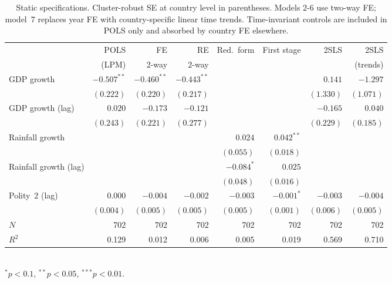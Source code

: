 \documentclass[11pt,a4paper]{article}
\begin{document}
\begin{table}[H]
\centering
\caption{Static specifications. Cluster-robust SE at country level in
parentheses. Models 2-6 use two-way FE; model~7 replaces year FE with
country-specific linear time trends. Time-invariant controls are
included in POLS only and absorbed by country FE elsewhere.}
\label{tab:main}
\small
\begin{tabular}{lrrrrrrr}
\toprule
 & POLS & FE & RE & Red.\ form & First stage & 2SLS & 2SLS \\
 & (LPM) & 2-way & 2-way & & & & (trends) \\
\midrule
GDP growth        & $-0.507^{**}$ & $-0.460^{**}$ & $-0.443^{**}$ &        &              & $0.141$       & $-1.297$ \\
                  & $(0.222)$     & $(0.220)$     & $(0.217)$     &        &              & $(1.330)$     & $(1.071)$ \\
GDP growth (lag)  & $0.020$       & $-0.173$      & $-0.121$      &        &              & $-0.165$      & $0.040$ \\
                  & $(0.243)$     & $(0.221)$     & $(0.277)$     &        &              & $(0.229)$     & $(0.185)$ \\
Rainfall growth   &               &               &               & $0.024$ & $0.042^{**}$ &              &  \\
                  &               &               &               & $(0.055)$ & $(0.018)$  &              &  \\
Rainfall growth (lag) &           &               &               & $-0.084^{*}$ & $0.025$ &              &  \\
                  &               &               &               & $(0.048)$ & $(0.016)$  &              &  \\
Polity~2 (lag)    & $0.000$       & $-0.004$      & $-0.002$      & $-0.003$ & $-0.001^{*}$ & $-0.003$    & $-0.004$ \\
                  & $(0.004)$     & $(0.005)$     & $(0.005)$     & $(0.005)$ & $(0.001)$   & $(0.006)$   & $(0.005)$ \\
\midrule
$N$               & 702 & 702 & 702 & 702 & 702 & 702 & 702 \\
$R^2$             & 0.129 & 0.012 & 0.006 & 0.005 & 0.019 & 0.569 & 0.710 \\
\bottomrule
\end{tabular}\\[2pt]
\footnotesize $^{*}p<0.1$, $^{**}p<0.05$, $^{***}p<0.01$.
\end{table}
\end{document}
